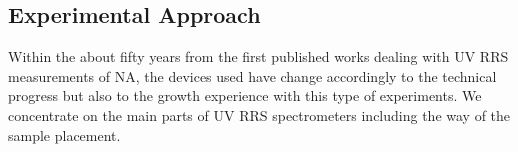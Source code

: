 \subsection{Experimental Approach}

Within the about fifty years from the first published works dealing with UV RRS
measurements of NA, the devices used have change accordingly to the technical
progress but also to the growth experience with this type of experiments.
We concentrate on the main parts of UV RRS spectrometers including the way of
the sample placement.







